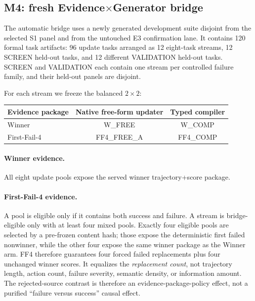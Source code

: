 \subsection{M4: fresh Evidence$\times$Generator bridge}
The automatic bridge uses a newly generated development suite disjoint from the selected S1 panel and from the untouched E3 confirmation lane. It contains 120 formal task artifacts: 96 update tasks arranged as 12 eight-task streams, 12 SCREEN held-out tasks, and 12 different VALIDATION held-out tasks. SCREEN and VALIDATION each contain one stream per controlled failure family, and their held-out panels are disjoint.

For each stream we freeze the balanced $2\times2$:
\begin{center}
\begin{tabular}{lcc}
\toprule
Evidence package & Native free-form updater & Typed compiler \\
\midrule
Winner & W\_FREE & W\_COMP \\
First-Fail-4 & FF4\_FREE\_A & FF4\_COMP \\
\bottomrule
\end{tabular}
\end{center}

\paragraph{Winner evidence.}
All eight update pools expose the served winner trajectory+score package.

\paragraph{First-Fail-4 evidence.}
A pool is eligible only if it contains both success and failure. A stream is bridge-eligible only with at least four mixed pools. Exactly four eligible pools are selected by a pre-frozen content hash; those expose the deterministic first failed nonwinner, while the other four expose the same winner package as the Winner arm. FF4 therefore guarantees four forced failed replacements plus four unchanged winner scores. It equalizes the \emph{replacement count}, not trajectory length, action count, failure severity, semantic density, or information amount. The rejected-source contrast is therefore an evidence-package-policy effect, not a purified ``failure versus success'' causal effect.

